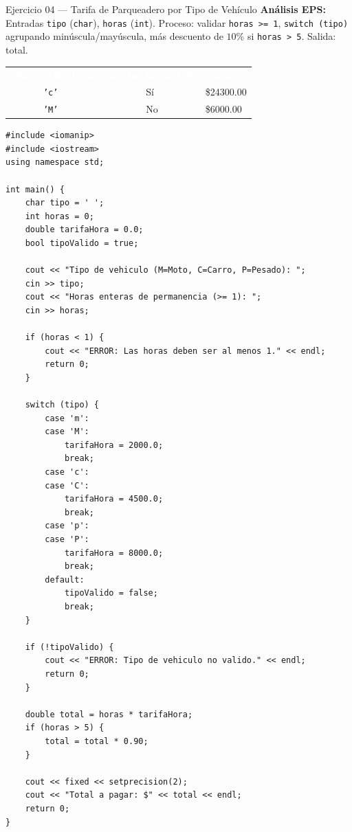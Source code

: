 \documentclass[11pt,letterpaper]{article}
\begin{document}
\begin{solucion}{Ejercicio 04 --- Tarifa de Parqueadero por Tipo de Vehículo}
\textbf{Análisis EPS:} Entradas \texttt{tipo} (\texttt{char}), \texttt{horas} (\texttt{int}). Proceso: validar \texttt{horas >= 1}, \texttt{switch (tipo)} agrupando minúscula/mayúscula, más descuento de $10\%$ si \texttt{horas > 5}. Salida: total.\\[4pt]
\footnotesize
\renewcommand{\arraystretch}{1.18}
\begin{tabularx}{\linewidth}{>{\centering\arraybackslash}p{1.2cm} >{\centering\arraybackslash}p{1.2cm} >{\centering\arraybackslash}p{1.2cm} >{\centering\arraybackslash}p{2.0cm} >{\centering\arraybackslash}p{2.0cm} X}
  \rowcolor{AzulMarino}
  \textcolor{white}{\textbf{Caso}} & \textcolor{white}{\texttt{tipo}} & \textcolor{white}{\texttt{horas}} & \textcolor{white}{\texttt{tarifa}} & \textcolor{white}{\textbf{Desc. 10\%}} & \textcolor{white}{\textbf{Total}} \\
  1 & \texttt{'c'} & 6 & 4500 & Sí & \$24300.00 \\
  2 & \texttt{'M'} & 3 & 2000 & No & \$6000.00 \\
  \bottomrule
\end{tabularx}
\end{solucion}

\begin{lstlisting}[style=cppmonitoria, caption={Solución E04 en C++}]
#include <iomanip>
#include <iostream>
using namespace std;

int main() {
    char tipo = ' ';
    int horas = 0;
    double tarifaHora = 0.0;
    bool tipoValido = true;

    cout << "Tipo de vehiculo (M=Moto, C=Carro, P=Pesado): ";
    cin >> tipo;
    cout << "Horas enteras de permanencia (>= 1): ";
    cin >> horas;

    if (horas < 1) {
        cout << "ERROR: Las horas deben ser al menos 1." << endl;
        return 0;
    }

    switch (tipo) {
        case 'm':
        case 'M':
            tarifaHora = 2000.0;
            break;
        case 'c':
        case 'C':
            tarifaHora = 4500.0;
            break;
        case 'p':
        case 'P':
            tarifaHora = 8000.0;
            break;
        default:
            tipoValido = false;
            break;
    }

    if (!tipoValido) {
        cout << "ERROR: Tipo de vehiculo no valido." << endl;
        return 0;
    }

    double total = horas * tarifaHora;
    if (horas > 5) {
        total = total * 0.90;
    }

    cout << fixed << setprecision(2);
    cout << "Total a pagar: $" << total << endl;
    return 0;
}
\end{lstlisting}
\end{document}
